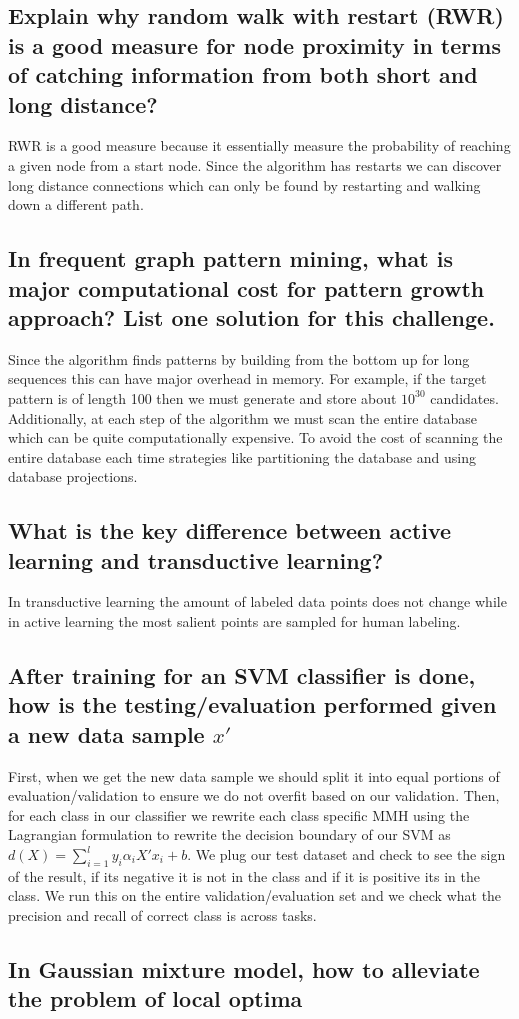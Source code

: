 \documentclass[11pt]{article}
\begin{document}
\subsection{Explain why random walk with restart (RWR) is a good measure for node proximity in terms of catching information from both short and long distance?}
RWR is a good measure because it essentially measure the probability of reaching a given node from a start node. Since the algorithm has restarts we can discover long distance connections which can only be found by restarting and walking down a different path. 
\subsection{In frequent graph pattern mining, what is major computational cost for pattern growth approach? List one solution for this challenge.}
Since the algorithm finds patterns by building from the bottom up for long sequences this can have major overhead in memory. For example, if the target pattern is of length 100 then we must generate and store about $10^30$ candidates. Additionally, at each step of the algorithm we must scan the entire database which can be quite computationally expensive. To avoid the cost of scanning the entire database each time strategies like partitioning the database and using database projections. 
\subsection{What is the key difference between active learning and transductive learning?}
In transductive learning the amount of labeled data points does not change while in active learning the most salient points are sampled for human labeling. 
\subsection{After training for an SVM classifier is done, how is the testing/evaluation performed given a new data sample $x'$}
First, when we get the new data sample we should split it into equal portions of evaluation/validation to ensure we do not overfit based on our validation. Then, for each class in our classifier we rewrite each class specific MMH using the Lagrangian formulation to rewrite the decision boundary of our SVM as $d(X) = \sum_{i=1}^l y_i \alpha_i X'x_i+b$. We plug our test dataset and check to see the sign of the result, if its negative it is not in the class and if it is positive its in the class. We run this on the entire validation/evaluation set and we check what the precision and recall of correct class is across tasks.
\subsection{In Gaussian mixture model, how to alleviate the problem of local optima}
\end{document}
